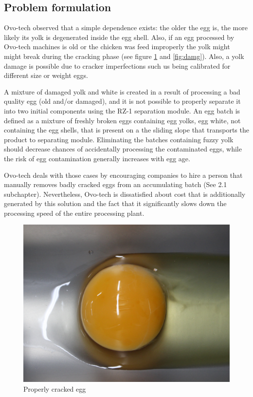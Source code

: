 \documentclass[12pt,twoside,a4paper]{article}
\begin{document}
\subsection{Problem formulation}
Ovo-tech observed that a simple dependence exists: the older the egg is, the more likely its yolk is degenerated inside the egg shell. Also, if an egg processed by Ovo-tech machines is old or the chicken was feed improperly the yolk might might break during the cracking phase (see figure \ref{fig:prop} and \ref{fig:damg}).
Also, a yolk damage is possible due to cracker imperfections such us being calibrated for different size or weight eggs.

A mixture of damaged yolk and white is created in a result of processing a bad quality egg (old and/or damaged), and it is not possible to properly separate it into two initial components using the RZ-1 separation module.
An egg batch is defined as a mixture of freshly broken eggs containing egg yolks, egg white, not containing the egg shells, that is present on a the sliding slope that transports the product to separating module.
Eliminating the batches containing fuzzy yolk should decrease chances of accidentally processing the contaminated eggs, while the risk of egg contamination generally increases with egg age.

Ovo-tech deals with those cases by encouraging companies to hire a person that manually removes badly cracked eggs from an accumulating batch (See 2.1 subchapter). Nevertheless, Ovo-tech is dissatisfied about cost that is additionally generated by this solution and the fact that it significantly slows down the processing speed of the entire processing plant.
\begin{figure}[H]
\centering
\includegraphics[width=0.4\paperwidth]{prop}
\caption{Properly cracked egg}\label{fig:prop}
\end{figure} 
\end{document}
